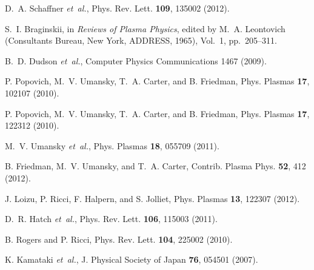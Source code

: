 \documentclass[showpacs,preprintnumbers,amsmath,amssymb,superscriptaddress,aip]{revtex4-1}
\begin{document}
\begin{thebibliography}{10}
D.~A. Schaffner {\it et~al.}, Phys. Rev. Lett. {\bf 109},  135002  (2012).

S.~I. Braginskii,  in {\em Reviews of Plasma Physics}, edited by M.~A.
  Leontovich (Consultants Bureau, New York, ADDRESS, 1965), Vol.~1, pp.\
  205--311.

B.~D. Dudson {\it et~al.}, Computer Physics Communications  1467  (2009).

P. Popovich, M.~V. Umansky, T.~A. Carter, and B. Friedman, Phys. Plasmas {\bf
  17},  102107  (2010).

P. Popovich, M.~V. Umansky, T.~A. Carter, and B. Friedman, Phys. Plasmas {\bf
  17},  122312  (2010).

M.~V. Umansky {\it et~al.}, Phys. Plasmas {\bf 18},  055709  (2011).

B. Friedman, M.~V. Umansky, and T.~A. Carter, Contrib. Plasma Phys. {\bf 52},
  412  (2012).

J. Loizu, P. Ricci, F. Halpern, and S. Jolliet, Phys. Plasmas {\bf 13},  122307
   (2012).

D.~R. Hatch {\it et~al.}, Phys. Rev. Lett. {\bf 106},  115003  (2011).

B. Rogers and P. Ricci, Phys. Rev. Lett. {\bf 104},  225002  (2010).

K. Kamataki {\it et~al.}, J. Physical Society of Japan {\bf 76},  054501
  (2007).

\end{thebibliography}
\end{document}
